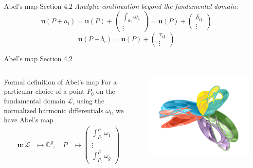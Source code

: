 \documentclass[11pt,aspectratio=169]{beamer}
\begin{document}
\begin{frame}{Abel's map}{\tiny \cite{Ber06} Section 4.2}
    \emph{Analytic continuation beyond the fundamental domain:}
    \[\mathbf{u}(P+a_i) = \mathbf{u}(P) + \begin{pmatrix} \int_{a_i} \omega_1 \\ \vdots \end{pmatrix} = \mathbf{u}(P) + \begin{pmatrix} \delta_{i1} \\ \vdots \end{pmatrix}\]
    \[\mathbf{u}(P+b_i) = \mathbf{u}(P) + \begin{pmatrix} \tau_{i1} \\ \vdots \end{pmatrix}\]
\end{frame}

\begin{frame}[noframenumbering]{Abel's map}{\tiny \cite{Ber06} Section 4.2}
    \begin{columns}
        \begin{column}{0.55\textwidth}
            \begin{block}{Formal definition of Abel's map}
                For a particular choice of a point $P_0$ on the fundamental domain $\mathcal L$, using the normalized harmonic differentials $\omega_i$, we have Abel's map
                \begin{align*}
                    \mathbf{u} : \mathcal L & \mapsto \mathbb{C}^g , \quad P & \mapsto \begin{pmatrix} \int_{P_0}^P \omega_1 \\ \vdots \\ \int_{P_0}^P \omega_g \end{pmatrix} &
                \end{align*}
            \end{block}
        \end{column}
        \begin{column}{0.45\textwidth}
            \center

            \includegraphics[width=0.7\columnwidth]{assets/Genus3Intermediate.png}


\end{column}
\end{columns}
\end{frame}
\end{document}
